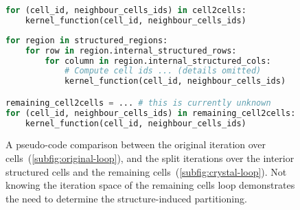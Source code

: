 \begin{figure}
\newsavebox{\firstlisting}
\begin{lrbox}{\firstlisting}

\begin{lstlisting}[language=python]
for (cell_id, neighbour_cells_ids) in cell2cells:
	kernel_function(cell_id, neighbour_cells_ids)
\end{lstlisting}
\end{lrbox}

\newsavebox{\secondlisting}
\begin{lrbox}{\secondlisting}
\begin{lstlisting}[language=python]
for region in structured_regions:
	for row in region.internal_structured_rows:
		for column in region.internal_structured_cols:
			# Compute cell ids ... (details omitted)
			kernel_function(cell_id, neighbour_cells_ids)

remaining_cell2cells = ... # this is currently unknown
for (cell_id, neighbour_cells_ids) in remaining_cell2cells:
	kernel_function(cell_id, neighbour_cells_ids)
\end{lstlisting}
\end{lrbox}

\sidebysideverticalnoncenter
{
\usebox{\firstlisting}
\caption{Applying a kernel function over the original cell-cell relation-map. Variable \lstinline|cell2cells| is the cell-cell relation-map.}
\label{subfig:original-loop}
}
{
\usebox{\secondlisting}
\caption{Applying a kernel function over the interior structured cells, followed by the remaining cells. Notice how no relation-map is required for the former loop. Variable \lstinline|remaining_cell2cells| is a presently unknown subset of the cell-cell relation-map which excludes interior structured cells. }
\label{subfig:crystal-loop}
}

\caption{A pseudo-code comparison between the original iteration over cells~(\ref{subfig:original-loop}), and the split iterations over the interior structured cells and the remaining cells~(\ref{subfig:crystal-loop}). Not knowing the iteration space of the remaining cells loop demonstrates the need to determine the structure-induced partitioning.}
\label{fig:comparing-loops}
\end{figure}



